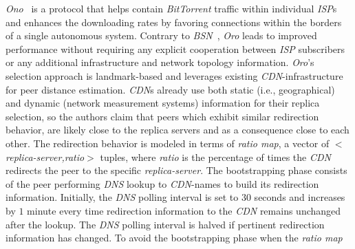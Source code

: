 \emph{Ono}~\cite{CB2008} is a protocol that helps contain
{\sl BitTorrent} traffic within individual \emph{ISP}s
and enhances the downloading rates by favoring connections
within the borders of a single autonomous system.
Contrary to \emph{BSN}~\cite{BCCMSBZ2006},
\emph{Oro} leads to improved performance 
without requiring any explicit cooperation between 
\emph{ISP} subscribers or any additional
infrastructure and network topology information.
\emph{Oro}'s selection approach is 
landmark-based and leverages existing {\sl CDN}-infrastructure 
for peer distance estimation. 
{\sl CDN}s already use both static (i.e., geographical) and dynamic
(network measurement systems) information for their replica selection, so the
authors claim that peers which exhibit similar redirection behavior, are 
likely close to the replica servers and as a consequence close to each other.
The redirection behavior is modeled in terms of \emph{ratio map}, 
a vector of \emph{$<$replica-server,ratio$>$} tuples, where \emph{ratio} is
the percentage of times the {\sl CDN} redirects the peer 
to the specific \emph{replica-server}.
The bootstrapping phase %
consists of the peer performing {\sl DNS} lookup to {\sl CDN}-names
to build its redirection information.
Initially, the {\sl DNS} polling interval is set to $30$ seconds 
and increases by $1$ minute every time redirection information 
to the {\sl CDN} remains unchanged after the lookup.
The {\sl DNS} polling interval is halved if pertinent 
redirection information has changed.
To avoid the bootstrapping phase when the \emph{ratio map} 
